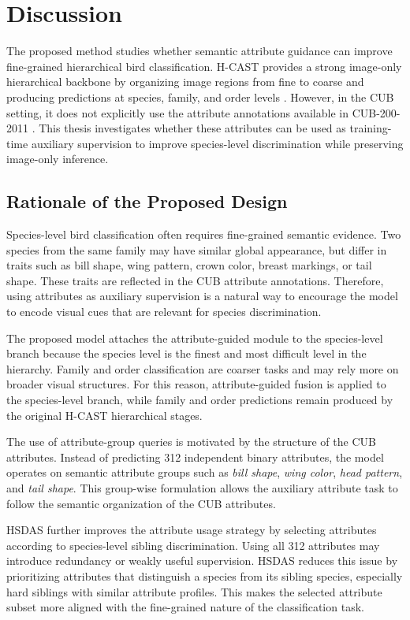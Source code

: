 \section{Discussion}

The proposed method studies whether semantic attribute guidance can improve fine-grained hierarchical bird classification. H-CAST provides a strong image-only hierarchical backbone by organizing image regions from fine to coarse and producing predictions at species, family, and order levels \cite{park2025visually}. However, in the CUB setting, it does not explicitly use the attribute annotations available in CUB-200-2011 \cite{wah2011cub}. This thesis investigates whether these attributes can be used as training-time auxiliary supervision to improve species-level discrimination while preserving image-only inference.

\subsection{Rationale of the Proposed Design}

Species-level bird classification often requires fine-grained semantic evidence. Two species from the same family may have similar global appearance, but differ in traits such as bill shape, wing pattern, crown color, breast markings, or tail shape. These traits are reflected in the CUB attribute annotations. Therefore, using attributes as auxiliary supervision is a natural way to encourage the model to encode visual cues that are relevant for species discrimination.

The proposed model attaches the attribute-guided module to the species-level branch because the species level is the finest and most difficult level in the hierarchy. Family and order classification are coarser tasks and may rely more on broader visual structures. For this reason, attribute-guided fusion is applied to the species-level branch, while family and order predictions remain produced by the original H-CAST hierarchical stages.

The use of attribute-group queries is motivated by the structure of the CUB attributes. Instead of predicting 312 independent binary attributes, the model operates on semantic attribute groups such as \textit{bill shape}, \textit{wing color}, \textit{head pattern}, and \textit{tail shape}. This group-wise formulation allows the auxiliary attribute task to follow the semantic organization of the CUB attributes.

HSDAS further improves the attribute usage strategy by selecting attributes according to species-level sibling discrimination. Using all 312 attributes may introduce redundancy or weakly useful supervision. HSDAS reduces this issue by prioritizing attributes that distinguish a species from its sibling species, especially hard siblings with similar attribute profiles. This makes the selected attribute subset more aligned with the fine-grained nature of the classification task.

